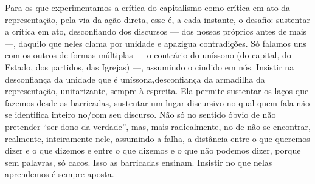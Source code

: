 Para os que experimentamos a crítica do capitalismo como crítica em ato
da representação, pela via da ação direta, esse é, a cada instante, o
desafio: sustentar a crítica em ato, desconfiando dos discursos --- dos
nossos próprios antes de mais ---, daquilo que neles clama por unidade e
apazigua contradições. Só falamos uns com os outros de formas múltiplas
--- o contrário do uníssono (do capital, do Estado, dos partidos, das
Igrejas) ---, assumindo o cindido em nós. Insistir na desconfiança da
unidade que é uníssona,desconfiança da armadilha da representação,
unitarizante, sempre à espreita. Ela permite sustentar os laços que
fazemos desde as barricadas, sustentar um lugar discursivo no qual quem
fala não se identifica inteiro no/com seu discurso. Não só no sentido
óbvio de não pretender ``ser dono da verdade'', mas, mais radicalmente,
no de não se encontrar, realmente, inteiramente nele, assumindo a falha,
a distância entre o que queremos dizer e o que dizemos e entre o que
dizemos e o que não podemos dizer, porque sem palavras, só cacos. Isso
as barricadas ensinam. Insistir no que nelas aprendemos é sempre aposta.

